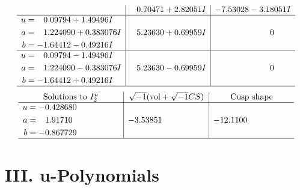 \documentclass[1p]{elsarticle_modified}
\theoremstyle{definition}
\newcommand{\I}{\sqrt{-1}}
\begin{document}
$$\begin{array}{c|c|c}
 & \phantom{-}0.70471 + 2.82051 I & -7.53028 - 3.18051 I \\ \hline\begin{aligned}
u &= \phantom{-}0.09794 + 1.49496 I \\
a &= \phantom{-}1.224090 + 0.383076 I \\
b &= -1.64412 - 0.49216 I\end{aligned}
 & \phantom{-}5.23630 + 0.69959 I & \phantom{-0.000000 } 0 \\ \hline\begin{aligned}
u &= \phantom{-}0.09794 - 1.49496 I \\
a &= \phantom{-}1.224090 - 0.383076 I \\
b &= -1.64412 + 0.49216 I\end{aligned}
 & \phantom{-}5.23630 - 0.69959 I & \phantom{-0.000000 } 0\\
 \hline 
 \end{array}$$\newpage$$\begin{array}{c|c|c}  
\text{Solutions to }I^u_{2}& \I (\text{vol} + \sqrt{-1}CS) & \text{Cusp shape}\\
 \hline 
\begin{aligned}
u &= -0.428680\phantom{ +0.000000I} \\
a &= \phantom{-}1.91710\phantom{ +0.000000I} \\
b &= -0.867729\phantom{ +0.000000I}\end{aligned}
 & -3.53851\phantom{ +0.000000I} & -12.1100\phantom{ +0.000000I}\\
 \hline 
 \end{array}$$\newpage
\newpage\renewcommand{\arraystretch}{1}
\centering \section*{ III. u-Polynomials}
\end{document}
